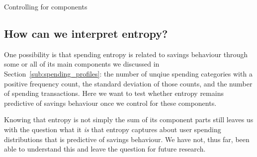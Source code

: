 
\begin{table}[ht]
\centering\footnotesize
\caption{Controlling for components}
\label{tab:entropy_on_components}

\end{table}




\subsection{How can we interpret entropy?}%
\label{sub:is_entropy_more_than_the_sum_of_its_parts_}

One possibility is that spending entropy is related to savings behaviour
through some or all of its main components we discussed in
Section~\ref{sub:spending_profiles}: the number of unqiue spending categories
with a positive frequency count, the standard deviation of those counts, and
the number of spending transactions. Here we want to test whether entropy
remains predictive of savings behaviour once we control for these components.

Knowing that entropy is not simply the sum of its component parts still leaves
us with the question what it \textit{is} that entropy captures about user
spending distributions that is predictive of savings behaviour. We have not,
thus far, been able to understand this and leave the question for future
research.



